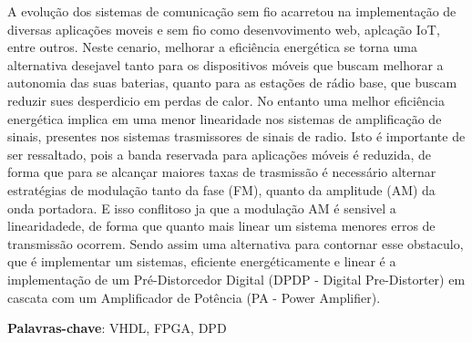     A evolução dos sistemas de comunicação sem fio acarretou na implementação de diversas aplicações moveis e sem fio como desenvovimento web, aplcação IoT, entre outros. Neste cenario, melhorar a eficiência energética se torna uma alternativa desejavel tanto para os dispositivos móveis que buscam melhorar a autonomia das suas baterias, quanto para as estações de rádio base, que buscam reduzir sues desperdicio em perdas de calor. No entanto uma melhor eficiência energética implica em uma menor linearidade nos sistemas de amplificação de sinais, presentes nos sistemas trasmissores de sinais de radio. Isto é importante de ser ressaltado, pois a banda reservada para aplicações móveis é reduzida, de forma que para se alcançar maiores taxas de trasmissão é necessário alternar estratégias de modulação tanto da fase (FM), quanto da amplitude (AM) da onda portadora. E isso conflitoso ja que a modulação AM  é sensivel a linearidadede, de forma que quanto mais linear um sistema menores erros de transmissão ocorrem. Sendo assim uma alternativa para contornar esse obstaculo, que é implementar um sistemas, eficiente energéticamente e linear é a implementação de um Pré-Distorcedor Digital (DPDP - Digital Pre-Distorter) em cascata com um Amplificador de Potência (PA - Power Amplifier).

\textbf{Palavras-chave}: VHDL, FPGA, DPD